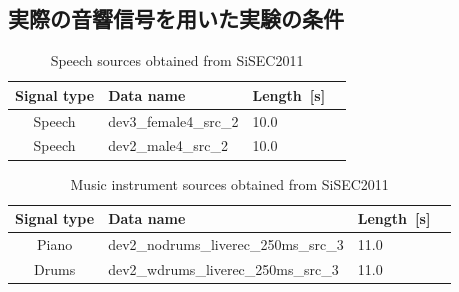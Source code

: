 \clearpage
\subsection{実際の音響信号を用いた実験の条件}
\label{sec:ex_condition_audio}


\begin{table}[t]
  \begin{center}
   \caption{Speech sources obtained from SiSEC2011}
   \label{table:wav}
    \begin{tabular}{clll}\hline \hline
     Signal type  & Data name &Length~[s]  \\ \hline
     Speech  & dev3\_female4\_src\_2 & 10.0  \\ \hline
     Speech  & dev2\_male4\_src\_2 &  10.0 \\ \hline
     \hline
    \end{tabular}
   \end{center}
\end{table}

\begin{table}[t]
  \begin{center}
   \caption{Music instrument sources obtained from SiSEC2011}
   \label{table:instrument}
    \begin{tabular}{clll}\hline \hline
     Signal type  & Data name &Length~[s]  \\ \hline
     Piano   & dev2\_nodrums\_liverec\_250ms\_src\_3 & 11.0\\ \hline
     Drums   & dev2\_wdrums\_liverec\_250ms\_src\_3 & 11.0 \\ \hline 
     \hline
    \end{tabular}
   \end{center}
\end{table}

